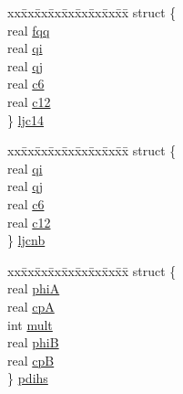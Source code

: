 \begin{DoxyCompactItemize}
\begin{tabbing}
\end{tabbing}\item 
\begin{tabbing}
xx\=xx\=xx\=xx\=xx\=xx\=xx\=xx\=xx\=\kill
struct \{\\
\>real \hyperlink{uniont__iparams_a3844045a1a4b1046e8037533a72903ef}{fqq}\\
\>real \hyperlink{uniont__iparams_aee9581fe6302a3c112b667e437e3c374}{qi}\\
\>real \hyperlink{uniont__iparams_af62340e9efc92aa98baed368eea14545}{qj}\\
\>real \hyperlink{uniont__iparams_ae0a64b8b583399113b65d1c5ec18a4fc}{c6}\\
\>real \hyperlink{uniont__iparams_a002c6e10a70be28bfb67d6c8e8d5c426}{c12}\\
\} \hyperlink{uniont__iparams_a5047af2c96b388062313ff68317e58fb}{ljc14}\\

\end{tabbing}\item 
\begin{tabbing}
xx\=xx\=xx\=xx\=xx\=xx\=xx\=xx\=xx\=\kill
struct \{\\
\>real \hyperlink{uniont__iparams_aee9581fe6302a3c112b667e437e3c374}{qi}\\
\>real \hyperlink{uniont__iparams_af62340e9efc92aa98baed368eea14545}{qj}\\
\>real \hyperlink{uniont__iparams_ae0a64b8b583399113b65d1c5ec18a4fc}{c6}\\
\>real \hyperlink{uniont__iparams_a002c6e10a70be28bfb67d6c8e8d5c426}{c12}\\
\} \hyperlink{uniont__iparams_a4577cace96f1af22e4c62a4e83c9574c}{ljcnb}\\

\end{tabbing}\item 
\begin{tabbing}
xx\=xx\=xx\=xx\=xx\=xx\=xx\=xx\=xx\=\kill
struct \{\\
\>real \hyperlink{uniont__iparams_a5c5b19324d8c524116233ac74540ce52}{phiA}\\
\>real \hyperlink{uniont__iparams_aa78ce5b05658d1160eb2e5fe986f93c0}{cpA}\\
\>int \hyperlink{uniont__iparams_a82b5289409257f018d5bee20af8a2296}{mult}\\
\>real \hyperlink{uniont__iparams_ad10fa405ec35e5d43c4fec2a1354787c}{phiB}\\
\>real \hyperlink{uniont__iparams_a6e446e230c4e90edebae546ec6be330b}{cpB}\\
\} \hyperlink{uniont__iparams_a95be6c104cb073fec79e3118e182ea98}{pdihs}\\


\end{tabbing}
\end{DoxyCompactItemize}
